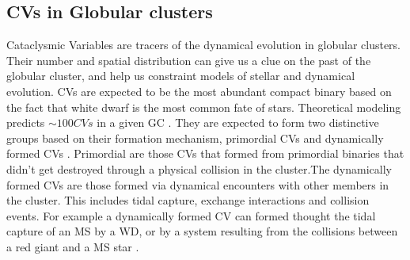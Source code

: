 

%

\subsection{CVs in Globular clusters}\label{sec:cogc}

Cataclysmic Variables are tracers of the dynamical evolution in globular clusters. Their number and spatial distribution can give us a clue on the past of the globular cluster, and help us constraint models of stellar and dynamical evolution. CVs are expected to be the most abundant compact binary based on the fact that white dwarf is the most common fate of stars. Theoretical modeling predicts $\sim 100CVs$ in a given GC \citep{ivanova_formation_2006}.  They are expected to form two distinctive groups based on their formation mechanism, primordial CVs and dynamically formed CVs \citep{hut_binaries_1992}. Primordial are those CVs that formed from primordial binaries that didn't get destroyed through a physical collision in the cluster.The dynamically formed CVs are those formed via dynamical encounters with other members in the cluster. This includes tidal capture, exchange interactions and collision events. For example a dynamically formed CV can formed thought the tidal capture of an MS by a WD, or by a system resulting from the collisions between a red giant and a MS star \citep{ivanova_formation_2006}. 

